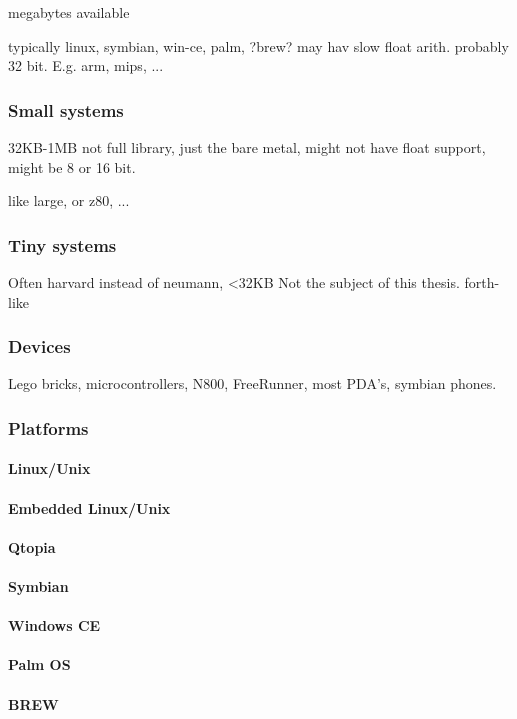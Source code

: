 megabytes available 

typically linux, symbian, win-ce, palm, ?brew?
may hav slow float arith.
probably 32 bit.
E.g. arm, mips, ...


\subsubsection{Small systems}
32KB-1MB
not full library,
just the bare metal,
might not have float support,
might be 8 or 16 bit.

like large, or z80, ...

\subsubsection{Tiny systems}
Often harvard instead of neumann,
<32KB
Not the subject of this thesis.
forth-like

\subsubsection{Devices}
Lego bricks, microcontrollers, N800, FreeRunner, most PDA's, symbian phones.
\subsubsection{Platforms}
\paragraph{Linux/Unix}
\paragraph{Embedded Linux/Unix}
\paragraph{Qtopia}
\paragraph{Symbian}
\paragraph{Windows CE}
\paragraph{Palm OS}
\paragraph{BREW}
